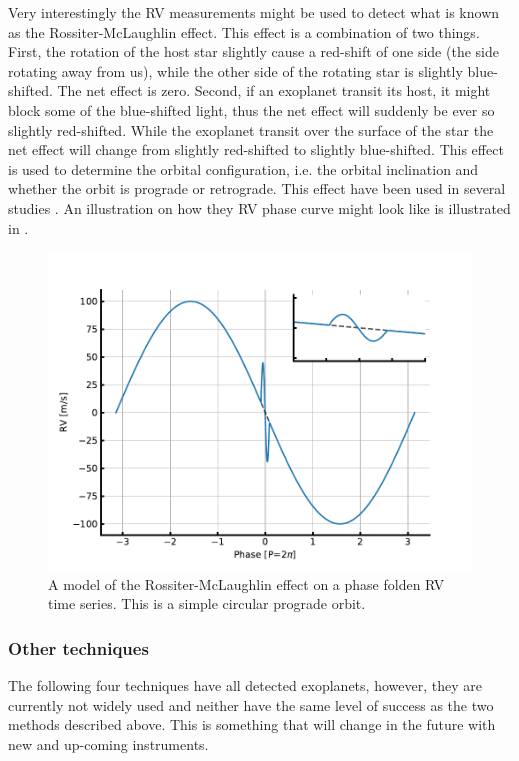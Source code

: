 Very interestingly the RV measurements might be used to detect what is known as the
Rossiter-McLaughlin effect. This effect is a combination of two things. First, the rotation of the
host star slightly cause a red-shift of one side (the side rotating away from us), while the other
side of the rotating star is slightly blue-shifted. The net effect is zero. Second, if an exoplanet
transit its host, it might block some of the blue-shifted light, thus the net effect will suddenly
be ever so slightly red-shifted. While the exoplanet transit over the surface of the star the net
effect will change from slightly red-shifted to slightly blue-shifted. This effect is used to
determine the orbital configuration, i.e. the orbital inclination and whether the orbit is prograde
or retrograde. This effect have been used in several studies \citep[][to mention just a
few]{Winn2005,Triaud2010}. An illustration on how they RV phase curve might look like is illustrated
in .

\begin{figure}[htpb!]
    \centering
    \includegraphics[width=1.0\linewidth]{figures/RMeffect.pdf}
    \caption{A model of the Rossiter-McLaughlin effect on a phase folden RV time series. This is a
             simple circular prograde orbit.}
    \label{fig:RMeffect}
\end{figure}

\subsubsection{Other techniques}

The following four techniques have all detected exoplanets, however, they are currently not widely
used and neither have the same level of success as the two methods described above. This is
something that will change in the future with new and up-coming instruments.

